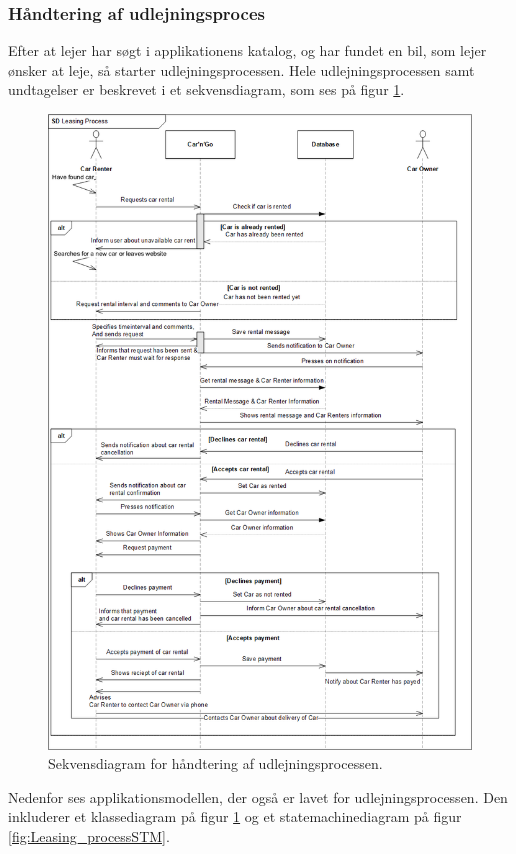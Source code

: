 \documentclass[Arkitektur/System_main.tex]{subfiles}
\begin{document}
\subsubsection{Håndtering af udlejningsproces}
Efter at lejer har søgt i applikationens katalog, og har fundet en bil, som lejer ønsker at leje, så starter udlejningsprocessen. Hele udlejningsprocessen samt undtagelser er beskrevet i et sekvensdiagram, som ses på figur \ref{fig:Leasing_processCD}.
\begin{figure}[H]
    \centering
    \includegraphics[width=1\textwidth]{Arkitektur/Softwarearkitektur/Leasing/graphics/Leasing_processSD.png}
    \caption{Sekvensdiagram for håndtering af udlejningsprocessen.}
    \label{fig:Leasing_processCD}
\end{figure}
Nedenfor ses applikationsmodellen, der også er lavet for udlejningsprocessen. Den inkluderer et klassediagram på figur \ref{fig:Leasing_processCD} og et statemachinediagram på figur \ref{fig:Leasing_processSTM}.
\end{document}
